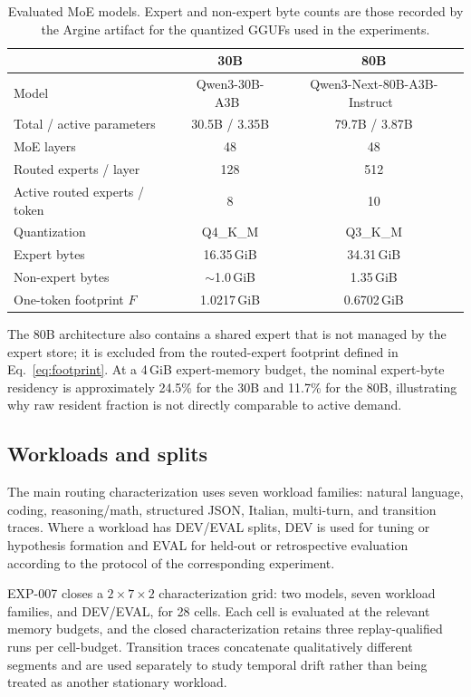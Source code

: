 \begin{table}[t]
    \centering
    \caption{Evaluated MoE models. Expert and non-expert byte counts are those recorded by the Argine artifact for the quantized GGUFs used in the experiments.}
    \label{tab:models}
    \small
    \begin{tabular}{lcc}
        \toprule
        & \textbf{30B} & \textbf{80B} \\
        \midrule
        Model & Qwen3-30B-A3B~\cite{qwen3technicalreport} & Qwen3-Next-80B-A3B-Instruct~\cite{qwen3next2025} \\
        Total / active parameters & 30.5B / 3.35B & 79.7B / 3.87B \\
        MoE layers & 48 & 48 \\
        Routed experts / layer & 128 & 512 \\
        Active routed experts / token & 8 & 10 \\
        Quantization & Q4\_K\_M & Q3\_K\_M \\
        Expert bytes & 16.35\,GiB & 34.31\,GiB \\
        Non-expert bytes & $\sim$1.0\,GiB & 1.35\,GiB \\
        One-token footprint $F$ & 1.0217\,GiB & 0.6702\,GiB \\
        \bottomrule
    \end{tabular}
\end{table}

The 80B architecture also contains a shared expert that is not managed by the expert store; it is excluded from the routed-expert footprint defined in Eq.~\eqref{eq:footprint}. At a 4\,GiB expert-memory budget, the nominal expert-byte residency is approximately 24.5\% for the 30B and 11.7\% for the 80B, illustrating why raw resident fraction is not directly comparable to active demand.

\subsection{Workloads and splits}

The main routing characterization uses seven workload families: natural language, coding, reasoning/math, structured JSON, Italian, multi-turn, and transition traces. Where a workload has DEV/EVAL splits, DEV is used for tuning or hypothesis formation and EVAL for held-out or retrospective evaluation according to the protocol of the corresponding experiment.

EXP-007 closes a $2\times 7\times 2$ characterization grid: two models, seven workload families, and DEV/EVAL, for 28 cells. Each cell is evaluated at the relevant memory budgets, and the closed characterization retains three replay-qualified runs per cell-budget. Transition traces concatenate qualitatively different segments and are used separately to study temporal drift rather than being treated as another stationary workload.

